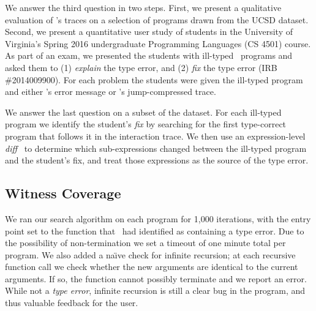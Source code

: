 We answer the third question in two steps.
%
First, we present a qualitative evaluation of \toolname's traces on a
selection of programs drawn from the UCSD dataset.
%
Second, we present a quantitative user study of students in the
University of Virginia's Spring 2016 undergraduate Programming Languages
(CS 4501) course.
%
As part of an exam, we presented the students with ill-typed \ocaml\
programs and asked them to
%
(1) \emph{explain} the type error, and
%
(2) \emph{fix} the type error (IRB \#2014009900).
%
For each problem the students were given the ill-typed program and
either \ocaml's error message or \toolname's jump-compressed trace.

We answer the last question on a subset of the \ucsdbench dataset.
%
For each ill-typed program we identify the student's \emph{fix}
by searching for the first type-correct program that follows it in
the interaction trace.
%
We then use an expression-level \emph{diff}~\cite{Lempsink2009-xf} to
determine which sub-expressions changed between the ill-typed program
and the student's fix, and treat those expressions as the source of the
type error.

\subsection{Witness Coverage}
\label{sec:eval:witness-coverage}
%
We ran our search algorithm on each program for 1,000 iterations, with
the entry point set to the function that \ocaml\ had identified as
containing a type error.
%
Due to the possibility of non-termination we set a timeout of one minute
total per program.
%
%
We also added a na{\"\i}ve check for infinite recursion; at each recursive
function call we check whether the new arguments are identical to the
current arguments.
%
If so, the function cannot possibly terminate and we report an error.
%
While not a \emph{type error}, infinite recursion is still a clear bug
in the program, and thus valuable feedback for the user.

